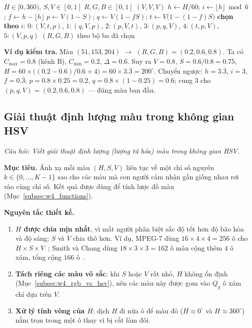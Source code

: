 \begin{algorithm}[ht]
\caption{Chuyển đổi HSV sang RGB}
\label{alg:w4_hsv2rgb}
\begin{algorithmic}[1]
\Require $H \in [0, 360)$, $S, V \in [0, 1]$
\Ensure $R, G, B \in [0, 1]$
 \State \Return $(V, V, V)$  \EndIf
\State $h \gets H / 60$; \quad $i \gets \lfloor h \rfloor \bmod 6$; \quad $f \gets h - \lfloor h \rfloor$
\State $p \gets V(1 - S)$; \quad $q \gets V(1 - fS)$; \quad $t \gets V\big(1 - (1 - f)S\big)$
\State \textbf{chọn theo} $i$: \;
$0\!: (V, t, p)$, \; $1\!: (q, V, p)$, \; $2\!: (p, V, t)$, \; $3\!: (p, q, V)$, \; $4\!: (t, p, V)$, \; $5\!: (V, p, q)$
\State \Return $(R, G, B)$ theo bộ ba đã chọn
\end{algorithmic}
\end{algorithm}

\textbf{Ví dụ kiểm tra.} Màu $(51, 153, 204)$ $\rightarrow$ $(R, G, B) = (0.2, 0.6, 0.8)$. Ta có $C_{\max} = 0.8$ (kênh B), $C_{\min} = 0.2$, $\Delta = 0.6$. Suy ra $V = 0.8$, $S = 0.6/0.8 = 0.75$, $H = 60 \times \big((0.2 - 0.6)/0.6 + 4\big) = 60 \times 3.\overline{3} = 200^\circ$. Chuyển ngược: $h = 3.\overline{3}$, $i = 3$, $f = 0.\overline{3}$; $p = 0.8 \times 0.25 = 0.2$, $q = 0.8 \times (1 - 0.25) = 0.6$; cung $3$ cho $(p, q, V) = (0.2, 0.6, 0.8)$ — đúng màu ban đầu.

\subsection{Giải thuật định lượng màu trong không gian HSV}
\label{subsec:w4_quant}

\textit{Câu hỏi: Viết giải thuật định lượng (lượng tử hóa) màu trong không gian HSV.}

\textbf{Mục tiêu.} Ánh xạ mỗi màu $(H, S, V)$ liên tục về một chỉ số nguyên $k \in \{0, \ldots, K - 1\}$ sao cho các màu mà con người cảm nhận gần giống nhau rơi vào cùng chỉ số. Kết quả được dùng để tính lược đồ màu (Mục~\ref{subsec:w4_functions}).

\textbf{Nguyên tắc thiết kế.}
\begin{enumerate}
    \item \textbf{$H$ được chia mịn nhất}, vì mắt người phân biệt sắc độ tốt hơn độ bão hòa và độ sáng; $S$ và $V$ chia thô hơn. Ví dụ, MPEG-7 dùng $16 \times 4 \times 4 = 256$ ô cho $H \times S \times V$~\citep{manjunath2001color}; Smith và Chang dùng $18 \times 3 \times 3 = 162$ ô màu cộng thêm $4$ ô xám, tổng cộng $166$ ô~\citep{smith1996visualseek}.
    \item \textbf{Tách riêng các màu vô sắc}: khi $S$ hoặc $V$ rất nhỏ, $H$ không ổn định (Mục~\ref{subsec:w4_rgb_vs_hsv}), nên các màu này được gom vào $Q_g$ ô xám chỉ dựa trên $V$.
    \item \textbf{Xử lý tính vòng của $H$}: dịch $H$ đi nửa ô để màu đỏ ($H \approx 0^\circ$ và $H \approx 360^\circ$) nằm trọn trong một ô thay vì bị cắt làm đôi.
\end{enumerate}

